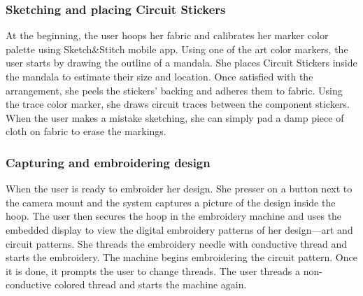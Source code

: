 \documentclass[header.tex]{subfiles}
\begin{document}
\subsubsection{Sketching and placing Circuit Stickers}
At the beginning, the user hoops her fabric and calibrates her marker color palette using Sketch\&Stitch mobile app. 
Using one of the art color markers, the user starts by drawing the outline of a mandala. She places Circuit Stickers inside the mandala to estimate their size and location. Once satisfied with the arrangement, she peels the stickers' backing and adheres them to fabric. Using the trace color marker, she draws circuit traces between the component stickers. When the user makes a mistake sketching, she can simply pad a damp piece of cloth on fabric to erase the markings. 

\subsubsection{Capturing and embroidering design}
When the user is ready to embroider her design. She presser on a button next to the camera mount and the system captures a picture of the design inside the hoop. The user then secures the hoop in the embroidery  machine and uses the embedded display to view the digital embroidery patterns of her design---art and circuit patterns. She threads the embroidery needle with conductive thread and starts the embroidery. The machine begins embroidering the circuit pattern. Once it is done, it prompts the user to change threads. The user threads a non-conductive colored thread and starts the machine again. 


\end{document}
